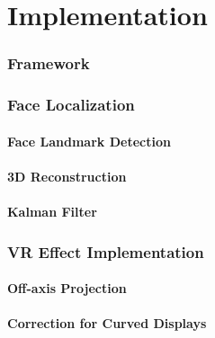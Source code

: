 \part{Implementation}
\section{Framework}
\section{Face Localization}
\subsection{Face  Landmark Detection}
\subsection{3D Reconstruction}
\subsection{Kalman Filter}
\section{VR Effect Implementation}
\subsection{Off-axis Projection}
\subsection{Correction for Curved Displays}
